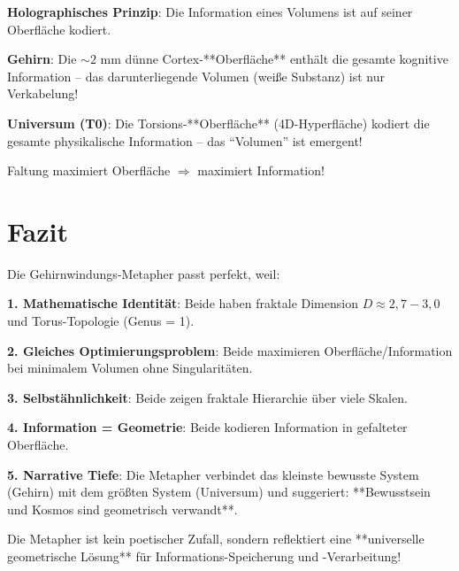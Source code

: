 	\begin{keyresult}[Holographie]
		\textbf{Holographisches Prinzip}: Die Information eines Volumens ist auf seiner Oberfläche kodiert.
		
		\vspace{0.3cm}
		
		\textbf{Gehirn}: Die $\sim 2$ mm dünne Cortex-**Oberfläche** enthält die gesamte kognitive Information -- das darunterliegende Volumen (weiße Substanz) ist nur Verkabelung!
		
		\vspace{0.3cm}
		
		\textbf{Universum (T0)}: Die Torsions-**Oberfläche** (4D-Hyperfläche) kodiert die gesamte physikalische Information -- das \enquote{Volumen} ist emergent!
		
		\vspace{0.3cm}
		
		Faltung maximiert Oberfläche $\Rightarrow$ maximiert Information!
	\end{keyresult}
	
	\section{Fazit}
	
	\begin{keyresult}
		Die Gehirnwindungs-Metapher passt perfekt, weil:
		
		\vspace{0.3cm}
		
		\textbf{1. Mathematische Identität}:
		Beide haben fraktale Dimension $D \approx 2,7 - 3,0$ und Torus-Topologie (Genus = 1).
		
		\vspace{0.3cm}
		
		\textbf{2. Gleiches Optimierungsproblem}:
		Beide maximieren Oberfläche/Information bei minimalem Volumen ohne Singularitäten.
		
		\vspace{0.3cm}
		
		\textbf{3. Selbstähnlichkeit}:
		Beide zeigen fraktale Hierarchie über viele Skalen.
		
		\vspace{0.3cm}
		
		\textbf{4. Information = Geometrie}:
		Beide kodieren Information in gefalteter Oberfläche.
		
		\vspace{0.3cm}
		
		\textbf{5. Narrative Tiefe}:
		Die Metapher verbindet das kleinste bewusste System (Gehirn) mit dem größten System (Universum) und suggeriert: **Bewusstsein und Kosmos sind geometrisch verwandt**.
		
		\vspace{0.3cm}
		
		Die Metapher ist kein poetischer Zufall, sondern reflektiert eine **universelle geometrische Lösung** für Informations-Speicherung und -Verarbeitung!
	\end{keyresult}
	
